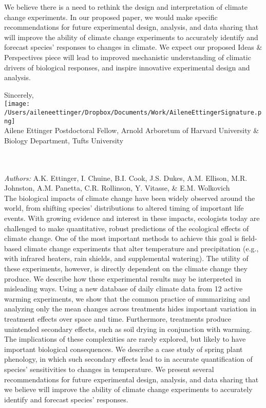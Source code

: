 \documentclass[12pt,a4paper]{letter}
\begin{document}
\begin{letter}{}
We believe there is a need to rethink the design and interpretation of climate change experiments. In our proposed paper, we would make specific recommendations for future experimental design, analysis, and data sharing that will improve the ability of climate change experiments to accurately identify and forecast species' responses to changes in climate. We expect our proposed Ideas \& Perspectives piece will lead to improved mechanistic understanding of climatic drivers of biological responses, and inspire innovative experimental design and analysis. 

Sincerely,\\

\texttt{[image: /Users/aileneettinger/Dropbox/Documents/Work/AileneEttingerSignature.png]} \\
Ailene Ettinger
Postdoctoral Fellow, Arnold Arboretum of Harvard University \& Biology Department, Tufts University

\newpage
{}\\
\\
\noindent \emph{Authors:} A.K. Ettinger, I. Chuine, B.I. Cook, J.S. Dukes, A.M. Ellison, M.R. Johnston, A.M. Panetta, C.R. Rollinson, Y. Vitasse, \& E.M. Wolkovich
\\
The biological impacts of climate change have been widely observed around the world, from shifting species' distributions to altered timing of important life events. With growing evidence and interest in these impacts, ecologists today are challenged to make quantitative, robust predictions of the ecological effects of climate change. One of the most important methods to achieve this goal is field-based climate change experiments that alter temperature and precipitation (e.g., with infrared heaters, rain shields, and supplemental watering). The utility of these experiments, however, is directly dependent on the climate change they produce. We describe how these experimental results may be interpreted in misleading ways. Using a new database of daily climate data from 12 active warming experiments, we show that the common practice of summarizing and analyzing only the mean changes across treatments hides important variation in treatment effects over space and time. Furthermore, treatments produce unintended secondary effects, such as soil drying in conjunction with warming. The implications of these complexities are rarely explored, but likely to have important biological consequences. We describe a case study of spring plant phenology, in which such secondary effects lead to in accurate quantification of species' sensitivities to changes in temperature. We present several recommendations for future experimental design, analysis, and data sharing that we believe will improve the ability of climate change experiments to accurately identify and forecast species' responses.
\end{letter}
\end{document}

